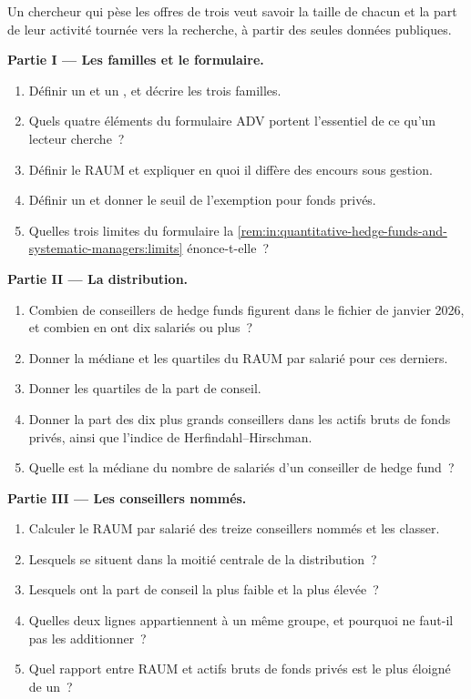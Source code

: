 \begin{problem}\label{pb:in:quantitative-hedge-funds-and-systematic-managers:1}
Un chercheur qui pèse les offres de trois  veut savoir la taille de chacun et la part de leur activité
tournée vers la recherche, à partir des seules données publiques.

\medskip\noindent\textbf{Partie I --- Les familles et le formulaire.}
\begin{enumerate}
\item Définir un  et un , et décrire les trois familles.
\item Quels quatre éléments du formulaire ADV portent l'essentiel de ce qu'un lecteur cherche~?
\item Définir le RAUM et expliquer en quoi il diffère des encours sous gestion.
\item Définir un  et donner le seuil de l'exemption pour fonds privés.
\item Quelles trois limites du formulaire la \cref{rem:in:quantitative-hedge-funds-and-systematic-managers:limits} énonce-t-elle~?
\end{enumerate}

\medskip\noindent\textbf{Partie II --- La distribution.}
\begin{enumerate}[resume]
\item Combien de conseillers de hedge funds figurent dans le fichier de janvier 2026, et combien en ont dix salariés ou plus~?
\item Donner la médiane et les quartiles du RAUM par salarié pour ces derniers.
\item Donner les quartiles de la part de conseil.
\item Donner la part des dix plus grands conseillers dans les actifs bruts de fonds privés, ainsi que l'indice de Herfindahl--Hirschman.
\item Quelle est la médiane du nombre de salariés d'un conseiller de hedge fund~?
\end{enumerate}

\medskip\noindent\textbf{Partie III --- Les conseillers nommés.}
\begin{enumerate}[resume]
\item Calculer le RAUM par salarié des treize conseillers nommés et les classer.
\item Lesquels se situent dans la moitié centrale de la distribution~?
\item Lesquels ont la part de conseil la plus faible et la plus élevée~?
\item Quelles deux lignes appartiennent à un même groupe, et pourquoi ne faut-il pas les additionner~?
\item Quel rapport entre RAUM et actifs bruts de fonds privés est le plus éloigné de un~?
\end{enumerate}


\end{problem}
